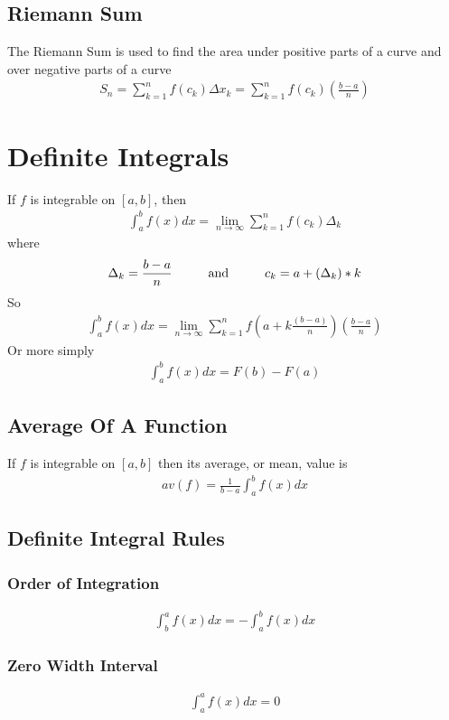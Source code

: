 \documentclass{article}
\newcommand\tab[1][1cm]{\hspace*{#1}}
\newcommand\regsum{\sum_{k=1}^{n}}
\newcommand\intab{\int_a^b}
\begin{document}
    \subsection{Riemann Sum}
        The Riemann Sum is used to find the area under positive parts of a curve and over negative parts of a curve
        \begin{gather*}
            S_n = \regsum f(c_k)\Delta x_k = \regsum f(c_k)\left(\frac{b-a}{n}\right)
            \end{gather*}
\section{Definite Integrals}
    If \(f\) is integrable on \([a, b]\), then
    \begin{gather*}
        \int_a^b f(x)dx = \lim_{n\to\infty} \regsum f(c_k)\Delta_k
    \end{gather*}
    where
    \begin{gather*}
        \Delta_k = \frac{b-a}{n} \text{\tab and\tab} c_k = a+(\Delta_k)*k
    \end{gather*}
    So
    \begin{gather*}
        \int_a^b f(x)dx = \lim_{n\to\infty} \regsum f\left(a + k\frac{(b-a)}{n}\right)\left(\frac{b-a}{n}\right)
    \end{gather*}
    Or more simply
    \begin{gather*}
        \intab f(x)dx = F(b)-F(a)
    \end{gather*}
    \subsection{Average Of A Function}
        If \(f\) is integrable on \([a, b]\) then its average, or mean, value is 
        \begin{gather*}
            av(f) = \frac{1}{b-a}\intab f(x)dx
        \end{gather*}
    \subsection{Definite Integral Rules}
        \subsubsection{Order of Integration}
            \begin{gather*}
                \int_b^a f(x)dx = -\intab f(x)dx
            \end{gather*}
        \subsubsection{Zero Width Interval}
            \begin{gather*}
                \int_a^a f(x)dx = 0
            \end{gather*}
\end{document}
